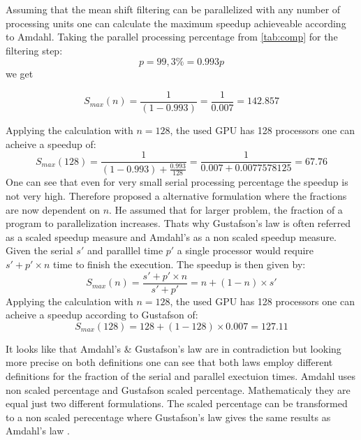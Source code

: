 Assuming that the mean shift filtering can be parallelized with any number of
processing units one can calculate the maximum speedup achieveable according to
Amdahl. Taking the parallel processing percentage from \autoref{tab:comp} for
the filtering step:
\begin{equation*}\label{eq:parallel}
  p = 99,3\% = 0.993 
  p\end{equation*}
we get

\begin{equation*}\label{eq:am0}
  S_{max}(n) = \frac{1}{(1-0.993)} = \frac{1}{0.007} = 142.857	
\end{equation*}

Applying the calculation with $n = 128$, the used \gls{GPU} has 128
processors one can acheive a speedup of:
\begin{equation*}\label{eq:g92sp}
  S_{max}(128) = \frac{1}{(1-0.993) + \frac{0.993}{128}} = \frac{1}{0.007 + 0.0077578125} = 67.76
\end{equation*}
One can see that even for very small serial processing percentage the speedup is
not very high. Therefore \citeauthor{citeulike:3732921} proposed a alternative
formulation where the fractions are now dependent on $n$. He assumed that for
larger problem, the fraction of a program to parallelization increases. Thats
why Gustafson's law is often referred as a scaled speedup measure and Amdahl's
as a non scaled speedup measure. Given the serial $s'$ and paralllel time $p'$ a
single processor would require $s' + p' \times n$ time to finish the execution.
The speedup is then given by:
\begin{equation}\label{eq:gus}
  S_{max}(n) = \frac{s' + p' \times n}{s' + p'} = n + ( 1 - n ) \times s'
\end{equation}
Applying the calculation with $n = 128$, the used \gls{GPU} has 128 processors
one can acheive a speedup according to Gustafson of:
\begin{equation*}\label{eq:g92sp}
  S_{max}(128) = 128 + (1 - 128) \times 0.007 = 127.11
\end{equation*}

It looks like that Amdahl's \& Gustafson's law are in contradiction but looking
more precise on both definitions one can see that both laws employ different
definitions for the fraction of the serial and parallel exectuion times. Amdahl
uses non scaled percentage and Gustafson scaled percentage. Mathematicaly they
are equal just two different formulations. The scaled percentage can be
transformed to a non scaled perecentage where Gustafson's law gives the same
results as Amdahl's law \citep{citeulike:3838998}.


